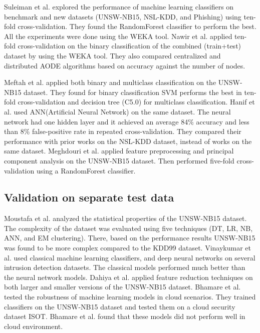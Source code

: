 \documentclass[14pt, conference]{IEEEtran}
\begin{document}
 Suleiman et al. \cite{suleiman2018performance} explored the performance of machine learning classifiers on benchmark
and new datasets (UNSW-NB15, NSL-KDD, and Phishing) using ten-fold cross-validation. They found the RandomForest
classifier to perform the best. All the experiments were done using the WEKA tool. 
Nawir et al. \cite{nawir2019effective} applied ten-fold cross-validation on the binary classification of the combined
(train+test) dataset by using the WEKA tool. They also compared centralized and distributed AODE algorithms based on accuracy against the number of nodes. 

Meftah et al. \cite{meftah2019network} applied both binary and multiclass classification on the UNSW-NB15 dataset. They found for binary classification SVM performs the best in ten-fold
cross-validation and decision tree (C5.0) for multiclass classification.
Hanif et al. \cite{hanif2019intrusion} used ANN(Artificial Neural Network) on the same dataset. The neural network had one hidden layer and it achieved an average 84\% accuracy and less
than 8\% false-positive rate in repeated cross-validation. They compared their performance with prior works on the NSL-KDD dataset, instead of works on the same dataset. Meghdouri et al. \cite{meghdouri2018analysis} applied feature preprocessing and principal component analysis on the UNSW-NB15 dataset. Then performed five-fold cross-validation using a RandomForest classifier.

\subsection{Validation on separate test data}
Moustafa et al. \cite{moustafa2016evaluation} analyzed the statistical properties of the UNSW-NB15 dataset. The complexity of the dataset was evaluated using five techniques (DT, LR, NB, ANN, and EM clustering). There, based on the performance results UNSW-NB15 was found to be more complex compared to the KDD99 dataset. Vinaykumar et al. \cite{vinayakumar2019deep} used classical machine learning classifiers, and deep neural networks on several intrusion detection datasets. The classical models performed much better than the neural network models.
Dahiya et al. \cite{dahiya2018network} applied feature reduction techniques on both larger and smaller versions of the UNSW-NB15 dataset. Bhamare et al. \cite{bhamare2016feasibility} tested the robustness of machine learning models in cloud scenarios. They trained classifiers on the UNSW-NB15 dataset and tested them on a cloud security dataset ISOT. Bhamare et al. \cite{bhamare2016feasibility} found that these models did not perform well in cloud environment.
\end{document}
